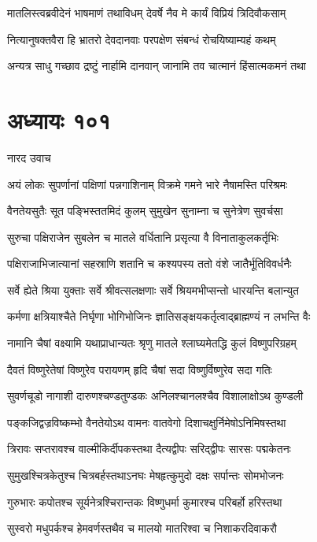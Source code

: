 \twolineshloka
{मातलिस्त्वब्रवीदेनं भाषमाणं तथाविधम्}
{देवर्षे नैव मे कार्यं विप्रियं त्रिदिवौकसाम्}


\twolineshloka
{नित्यानुषक्तवैरा हि भ्रातरो देवदानवाः}
{परपक्षेण संबन्धं रोचयिष्याम्यहं कथम्}


\twolineshloka
{अन्यत्र साधु गच्छाव द्रष्टुं नार्हामि दानवान्}
{जानामि तव चात्मानं हिंसात्मकमनं तथा}


\chapter{अध्यायः १०१}
\twolineshloka
{नारद उवाच}
{}


\twolineshloka
{अयं लोकः सुपर्णानां पक्षिणां पन्नगाशिनाम्}
{विक्रमे गमने भारे नैषामस्ति परिश्रमः}


\twolineshloka
{वैनतेयसुतैः सूत पङ्भिस्ततमिदं कुलम्}
{सुमुखेन सुनाम्ना च सुनेत्रेण सुवर्चसा}


\twolineshloka
{सुरुचा पक्षिराजेन सुबलेन च मातले}
{वर्धितानि प्रसृत्या वै विनाताकुलकर्तृभिः}


\twolineshloka
{पक्षिराजाभिजात्यानां सहस्राणि शतानि च}
{कश्यपस्य ततो वंशे जातैर्भूतिविवर्धनैः}


\twolineshloka
{सर्वे ह्येते श्रिया युक्ताः सर्वे श्रीवत्सलक्षणाः}
{सर्वे श्रियमभीप्सन्तो धारयन्ति बलान्युत}


\twolineshloka
{कर्मणा क्षत्रियाश्चैते निर्घृणा भोगिभोजिनः}
{ज्ञातिसङ्क्षयकर्तृत्वाद्ब्राह्मण्यं न लभन्ति वैः}


\twolineshloka
{नामानि चैषां वक्ष्यामि यथाप्राधान्यतः श्रृणु}
{मातले श्लाघ्यमेतद्धि कुलं विष्णुपरिग्रहम्}


\twolineshloka
{दैवतं विष्णुरेतेषां विष्णुरेव परायणम्}
{हृदि चैषां सदा विष्णुर्विष्णुरेव सदा गतिः}


\twolineshloka
{सुवर्णचूडो नागाशी दारुणश्चण्डतुण्डकः}
{अनिलश्चानलश्चैव विशालाक्षोऽथ कुण्डली}


\twolineshloka
{पङ्कजिद्वज्रविष्कम्भो वैनतेयोऽथ वामनः}
{वातवेगो दिशाचक्षुर्निमेषोऽनिमिषस्तथा}


\twolineshloka
{त्रिरावः सप्तरावश्च वाल्मीकिर्दीपकस्तथा}
{दैत्यद्वीपः सरिद्द्वीपः सारसः पद्मकेतनः}


\twolineshloka
{सुमुखश्चित्रकेतुश्च चित्रबर्हस्तथाऽनघः}
{मेषहृत्कुमुदो दक्षः सर्पान्तः सोमभोजनः}


\twolineshloka
{गुरुभारः कपोतश्च सूर्यनेत्रश्चिरान्तकः}
{विष्णुधर्मा कुमारश्च परिबर्हो हरिस्तथा}


\twolineshloka
{सुस्वरो मधुपर्कश्च हेमवर्णस्तथैव च}
{मालयो मातरिश्वा च निशाकरदिवाकरौ}


